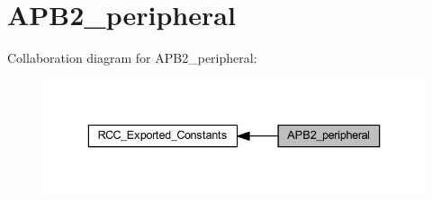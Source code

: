 \hypertarget{group___a_p_b2__peripheral}{}\section{A\+P\+B2\+\_\+peripheral}
\label{group___a_p_b2__peripheral}
Collaboration diagram for A\+P\+B2\+\_\+peripheral\+:
\nopagebreak
\begin{figure}[H]
\begin{center}
\leavevmode
\includegraphics[width=336pt]{group___a_p_b2__peripheral}
\end{center}
\end{figure}
